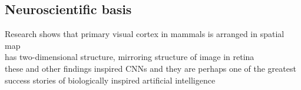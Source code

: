 \documentclass{article}
\begin{document}
\subsection*{Neuroscientific basis}
Research shows that primary visual cortex in mammals is arranged in spatial map \\
has two-dimensional structure, mirroring structure of image in retina \\
these and other findings inspired CNNs and they are perhaps one of the greatest success stories of biologically inspired artificial intelligence
\end{document}

